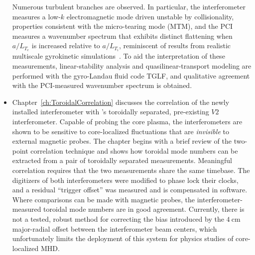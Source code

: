 \begin{itemize}
    Numerous turbulent branches are observed.
    In particular, the interferometer measures
    a low-$k$ electromagnetic mode driven unstable by collisionality,
    properties consistent with the micro-tearing mode (MTM), and
    the PCI measures a wavenumber spectrum
    that exhibits distinct flattening
    when $a / L_{T_e}$ is increased relative to $a / L_{T_i}$,
    reminiscent of results
    from realistic multiscale gyrokinetic simulations~\cite{howard_pp16}.
    To aid the interpretation of these measurements,
    linear-stability analysis and quasilinear-transport modeling
    are performed with the gyro-Landau fluid code TGLF, and
    qualitative agreement with the PCI-measured wavenumber spectrum
    is obtained.
  \item Chapter~\ref{ch:ToroidalCorrelation} discusses the correlation
    of the newly installed interferometer with
    \diiid's toroidally separated, pre-existing $V2$ interferometer.
    Capable of probing the core plasma,
    the interferometers are shown to be sensitive
    to core-localized fluctuations
    that are \emph{invisible} to external magnetic probes.
    The chapter begins with a brief review
    of the two-point correlation technique and
    shows how toroidal mode numbers can be extracted
    from a pair of toroidally separated measurements.
    Meaningful correlation requires that
    the two measurements share the same timebase.
    The digitizers of both interferometers were modified
    to phase lock their clocks, and
    a residual ``trigger offset'' was measured
    and is compensated in software.
    Where comparisons can be made with magnetic probes,
    the interferometer-measured toroidal mode numbers
    are in good agreement.
    Currently, there is not a tested, robust method
    for correcting the bias introduced by
    the $\SI{4}{\centi\meter}$ major-radial offset
    between the interferometer beam centers,
    which unfortunately limits the
    deployment of this system for physics studies
    of core-localized MHD.
\end{itemize}


